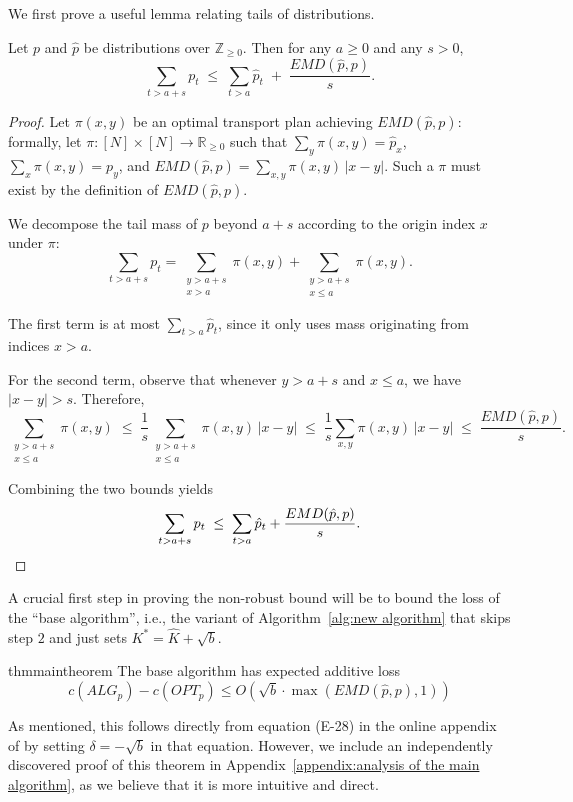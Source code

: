 We first prove a useful lemma relating tails of distributions.

\begin{lemma}
\label{lem:EMD-tail}
Let $p$ and $\hat p$ be distributions over $\mathbb{Z}_{\ge 0}$. Then for any $a\ge 0$ and any $s>0$,
\[\sum_{t>a+s} p_t \;\le\; \sum_{t>a} \hat p_t \;+\; \frac{EMD(\hat p,p)}{s}.\]
\end{lemma}

\begin{proof}
Let $\pi(x,y)$ be an optimal transport plan achieving $EMD(\hat p,p)$: formally, let $\pi: [N] \times [N] \rightarrow \mathbb{R}_{\geq 0}$ such that $\sum_y \pi(x,y)=\hat p_x$, $\sum_x \pi(x,y)=p_y$,
and $EMD(\hat p,p)=\sum_{x,y} \pi(x,y)\,|x-y|$.
Such a $\pi$ must exist by the definition of $EMD(\hat p, p)$.  

We decompose the tail mass of $p$ beyond $a+s$ according to the origin index $x$ under $\pi$:
\[\sum_{t>a+s} p_t = \sum_{\substack{y>a+s \\ x>a}} \pi(x,y) + \sum_{\substack{y>a+s \\ x\le a}} \pi(x,y).\]

The first term is at most $\sum_{t>a} \hat p_t$, since it only uses mass originating from indices $x>a$.

For the second term, observe that whenever $y>a+s$ and $x\le a$, we have $|x-y|>s$.
Therefore,
\[\sum_{\substack{y>a+s \\ x\le a}} \pi(x,y) \;\le\; \frac{1}{s} \sum_{\substack{y>a+s \\ x\le a}} \pi(x,y)\,|x-y| \;\le\; \frac{1}{s} \sum_{x,y} \pi(x,y)\,|x-y| \;\le\; \frac{EMD(\hat p,p)}{s}. \]

Combining the two bounds yields
\[\sum_{t>a+s} p_t \;\le\; \sum_{t>a} \hat p_t + \frac{EMD(\hat p,p)}{s}. \qedhere\]
\end{proof}

A crucial first step in proving the non-robust bound will be to bound the loss of the ``base algorithm'', i.e., the variant of Algorithm~\ref{alg:new algorithm} that skips step $2$ and just sets $K^* = \hat K + \sqrt{b}$.  

\begin{restatable}{thm}{maintheorem} \label{thm:main}
    The base algorithm has expected additive loss
    \[c(ALG_p) - c(OPT_p) \leq O\left(\sqrt{b} \cdot \max\left(EMD(\hat p, p), 1\right)\right)\]
\end{restatable}

As mentioned, this follows directly from equation (E-28) in the online appendix of \citet{besbes} by setting $\delta=-\sqrt{b}$ in that equation.  However, we include an independently discovered proof of this theorem in Appendix~\ref{appendix:analysis of the main algorithm}, as we believe that it is more intuitive and direct.  

